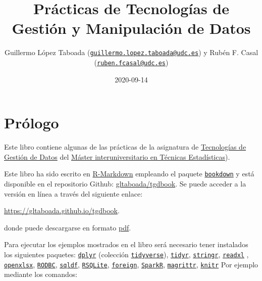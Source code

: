\documentclass[]{book}
\title{Prácticas de Tecnologías de Gestión y Manipulación de Datos}
\author{Guillermo López Taboada (\href{mailto:guillermo.lopez.taboada@udc.es}{\nolinkurl{guillermo.lopez.taboada@udc.es}}) y Rubén F. Casal (\href{mailto:ruben.fcasal@udc.es}{\nolinkurl{ruben.fcasal@udc.es}})}
\date{2020-09-14}
\begin{document}
\maketitle

{
\setcounter{tocdepth}{1}
\tableofcontents
}
\hypertarget{prologo}{%
\chapter*{Prólogo}\label{prologo}}

Este libro contiene algunas de las prácticas de la asignatura de \href{http://eamo.usc.es/pub/mte/index.php/es/?option=com_content\&view=article\&id=2202\&idm=38\&a\%C3\%B1o=2020}{Tecnologías de Gestión de Datos} del \href{http://eio.usc.es/pub/mte}{Máster interuniversitario en Técnicas Estadísticas}).

Este libro ha sido escrito en \href{http://rmarkdown.rstudio.com}{R-Markdown} empleando el paquete \href{https://bookdown.org/yihui/bookdown/}{\texttt{bookdown}} y está disponible en el repositorio Github: \href{https://github.com/gltaboada/tgdbook}{gltaboada/tgdbook}.
Se puede acceder a la versión en línea a través del siguiente enlace:

\url{https://gltaboada.github.io/tgdbook}.

donde puede descargarse en formato \href{https://gltaboada.github.io/tgdbook/Practicas_de_TGD.pdf}{pdf}.

Para ejecutar los ejemplos mostrados en el libro será necesario tener instalados los siguientes paquetes:
\href{https://dplyr.tidyverse.org}{\texttt{dplyr}} (colección \href{https://www.tidyverse.org/}{\texttt{tidyverse}}),
\href{https://tidyr.tidyverse.org}{\texttt{tidyr}},
\href{https://stringr.tidyverse.org}{\texttt{stringr}},
\href{https://readxl.tidyverse.org}{\texttt{readxl}} ,
\href{https://cran.r-project.org/web/packages/openxlsx/index.html}{\texttt{openxlsx}}, \href{https://cran.r-project.org/web/packages/RODBC/index.html}{\texttt{RODBC}},
\href{https://cran.r-project.org/web/packages/sqldf/index.html}{\texttt{sqldf}},
\href{https://r-dbi.github.io/RSQLite}{\texttt{RSQLite}},
\href{https://cran.r-project.org/web/packages/foreign/index.html}{\texttt{foreign}},
\href{https://cran.r-project.org/web/packages/SparkR/index.html}{\texttt{SparkR}},
\href{https://cran.r-project.org/web/packages/magrittr/index.html}{\texttt{magrittr}},
\href{https://yihui.name/knitr}{\texttt{knitr}}
Por ejemplo mediante los comandos:
\end{document}
